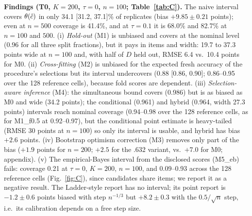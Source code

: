 \begin{table}[t]
\caption{\textbf{Calibration of reporting methods (T0), $K=200$, $n=100$, 1000 replicates per cell} ($n=500$ and the other methods in the appendix, Table~\ref{tab:Cfull}). Bias and RMSE in accuracy points; coverage with Wilson 95\% interval; width in points; items used for the report. Ladder/optimism-corrected point reports have no interval and appear in the appendix.}
\label{tab:C}
\centering\scriptsize
\resizebox{\linewidth}{!}{}
\end{table}

\textbf{Findings (T0, $K=200$, $\tau=0$, $n=100$; Table~\ref{tab:C}).} The naive interval covers $\theta(\hat c)$ in only 34.1 [31.2, 37.1]\% of replicates (bias $+9.85\pm0.21$ points); even at $n=500$ coverage is 41.4\%, and at $\tau=0.1$ it is 68.0\% and 82.7\% at $n=100$ and $500$. (i) \emph{Hold-out} (M1) is unbiased and covers at the nominal level (0.96 for all three split fractions), but it pays in items and width: 19.7 to 37.3 points wide at $n=100$ and, with half of $D$ held out, RMSE 6.4 vs.\ 10.4 points for M0. (ii) \emph{Cross-fitting} (M2) is unbiased for the expected fresh accuracy of the procedure's selections but its interval undercovers (0.88 [0.86, 0.90]; 0.86--0.95 over the 128 reference cells), because fold scores are dependent. (iii) \emph{Selection-aware inference} (M4): the simultaneous bound covers (0.986) but is as biased as M0 and wide (34.2 points); the conditional (0.961) and hybrid (0.964, width 27.3 points) intervals reach nominal coverage (0.94--0.98 over the 128 reference cells, as for M1\_f0.5 at 0.92--0.97), but the conditional point estimate is heavy-tailed (RMSE 30 points at $n=100$) so only its interval is usable, and hybrid has bias $+2.6$ points. (iv) Bootstrap optimism correction (M3) removes only part of the bias ($+1.9$ points for $n=200$; $+2.5$ for the .632 variant, vs.\ $+7.0$ for M0; appendix). (v) The empirical-Bayes interval from the disclosed scores (M5\_eb) fails: coverage 0.21 at $\tau=0$, $K=200$, $n=100$, and 0.09--0.93 across the 128 reference cells (Fig.~\ref{fig:C}), since candidates share items; we report it as a negative result. The Ladder-style report has no interval; its point report is $-1.2\pm0.6$ points biased with step $n^{-1/3}$ but $+8.2\pm0.3$ with the $0.5/\sqrt n$ step, i.e.\ its calibration depends on a free step size.

\begin{table}[t]
\caption{\textbf{False-claim rate and power of ``tuned beats baseline by $>2$ points'' (\%, Wilson 95\%), $K=200$, $n=100$ (T0).} ``point'': estimate difference exceeds $m$; ``lower bound'': the method's 95\% lower bound exceeds the baseline's estimate $+m$. At $\tau=0$ the true gain is 0. At $\tau=0.1$, 162 false-claim and 608 power replicates (per-cell counts in \texttt{tables/table\_d\_all\_cells.csv}).}
\label{tab:D}
\centering\scriptsize
\resizebox{\linewidth}{!}{}
\end{table}


